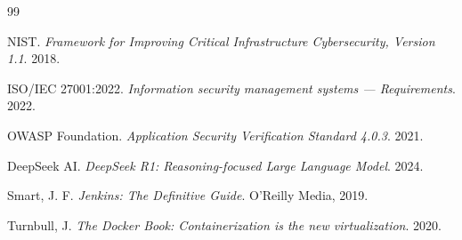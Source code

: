 \documentclass[12pt,a4paper]{report}
\begin{document}
\begin{thebibliography}{99}

NIST. \textit{Framework for Improving Critical Infrastructure Cybersecurity, Version 1.1}. 2018.

ISO/IEC 27001:2022. \textit{Information security management systems — Requirements}. 2022.

OWASP Foundation. \textit{Application Security Verification Standard 4.0.3}. 2021.

DeepSeek AI. \textit{DeepSeek R1: Reasoning-focused Large Language Model}. 2024.

Smart, J. F. \textit{Jenkins: The Definitive Guide}. O'Reilly Media, 2019.

Turnbull, J. \textit{The Docker Book: Containerization is the new virtualization}. 2020.

\end{thebibliography}
\end{document}
